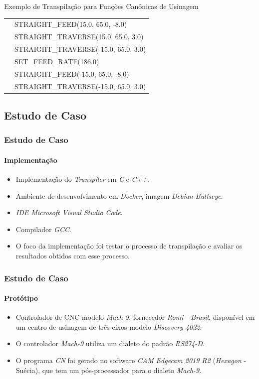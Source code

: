 \documentclass[aspectratio=169]{beamer}
\begin{document}
{\begin{frame}{Exemplo de Transpilação para Funções Canônicas de Usinagem}
\begin{table}[H]
\begin{tabular}{ |l|l| }
      & \tiny{STRAIGHT\_FEED(15.0, 65.0, -8.0)} \\
      & \tiny{STRAIGHT\_TRAVERSE(15.0, 65.0, 3.0)} \\
      & \tiny{STRAIGHT\_TRAVERSE(-15.0, 65.0, 3.0)} \\
      & \tiny{SET\_FEED\_RATE(186.0)} \\
      & \tiny{STRAIGHT\_FEED(-15.0, 65.0, -8.0)} \\
      & \tiny{STRAIGHT\_TRAVERSE(-15.0, 65.0, 3.0)} \\
      \hline    
    \end{tabular}    
  \end{table}
\end{frame}


\subsection{Estudo de Caso}

\begin{frame}
  \frametitle{Estudo de Caso}
  \framesubtitle{Implementação}

  \begin{itemize}
    \item Implementação do \emph{Transpiler} em \emph{C} e \emph{C++}.
    \item Ambiente de desenvolvimento em \emph{Docker}, 
          imagem \emph{Debian Bullseye}.
    \item \emph{IDE Microsoft Visual Studio Code}.
    \item Compilador \emph{GCC}.
    \item O foco da implementação foi testar o processo de transpilação 
          e avaliar os resultados obtidos com esse processo.
  \end{itemize}

  \end{frame}


\begin{frame}
  \frametitle{Estudo de Caso}
  \framesubtitle{Protótipo}

  \begin{itemize}
    \item Controlador de CNC modelo \emph{Mach-9}, fornecedor 
          \emph{Romi - Brasil}, disponível em um centro de usinagem de
           três eixos modelo \emph{Discovery 4022}.
    \item O controlador \emph{Mach-9} utiliza um dialeto do padrão 
          \emph{RS274-D}.
    \item O programa \emph{CN} foi gerado no software \emph{CAM} 
          \emph{Edgecam 2019 R2} (\emph{Hexagon} - Suécia), que tem um 
          pós-processador para o dialeto \emph{Mach-9}.
  \end{itemize}


\end{frame}}
\end{document}
